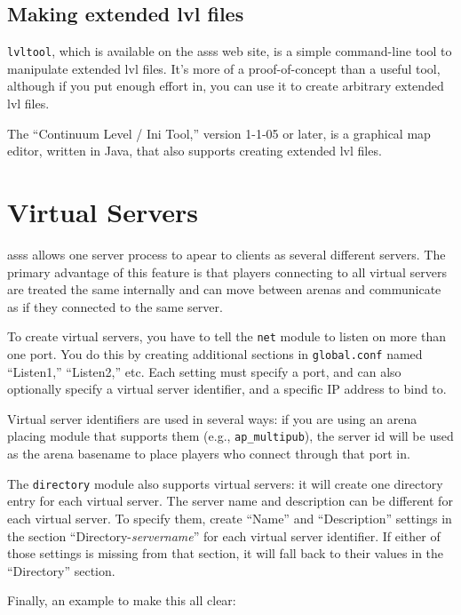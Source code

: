 \documentclass{article}
\newcommand{\asss}{asss}
\begin{document}
\subsection{Making extended lvl files}

\verb/lvltool/, which is available on the \asss{} web site, is a simple
command-line tool to manipulate extended lvl files. It's more of a
proof-of-concept than a useful tool, although if you put enough effort
in, you can use it to create arbitrary extended lvl files.

The ``Continuum Level / Ini Tool,'' version 1-1-05 or later, is a
graphical map editor, written in Java, that also supports creating
extended lvl files.



\section{Virtual Servers}

\asss{} allows one server process to apear to clients as several
different servers. The primary advantage of this feature is that players
connecting to all virtual servers are treated the same internally and
can move between arenas and communicate as if they connected to the same
server.

To create virtual servers, you have to tell the \verb/net/ module to
listen on more than one port. You do this by creating additional
sections in \verb/global.conf/ named ``Listen1,'' ``Listen2,'' etc. Each
setting must specify a port, and can also optionally specify a virtual
server identifier, and a specific IP address to bind to.

Virtual server identifiers are used in several ways: if you are using an
arena placing module that supports them (e.g., \verb/ap_multipub/), the
server id will be used as the arena basename to place players who
connect through that port in.

The \verb/directory/ module also supports virtual servers: it will
create one directory entry for each virtual server. The server name and
description can be different for each virtual server. To specify them,
create ``Name'' and ``Description'' settings in the section
``Directory-\emph{servername}'' for each virtual server identifier. If
either of those settings is missing from that section, it will fall back
to their values in the ``Directory'' section.

Finally, an example to make this all clear:
\end{document}
